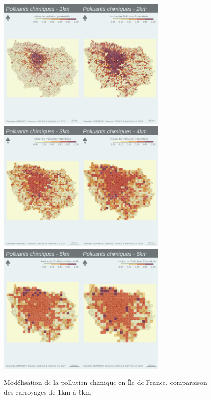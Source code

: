 \documentclass[a4paper,twoside,12pt]{book}
\begin{document}
\clearpage
\begin{figure}[!h] 
\centering  
\includegraphics[width=0.75\textwidth]{img/chapitre4/CARROYAGE_IPP_CHIMIQUE_1KM_2KM.png}
\includegraphics[width=0.75\textwidth]{img/chapitre4/CARROYAGE_IPP_CHIMIQUE_3KM_4KM.png}
\includegraphics[width=0.75\textwidth]{img/chapitre4/CARROYAGE_IPP_CHIMIQUE_5KM_6KM.png}
\caption{Modélisation de la pollution chimique en Île-de-France, comparaison des carroyages de 1km à 6km} 
\label{fig:carte_carroyages_IPP_Chimique_1}
\end{figure} 
\end{document}
